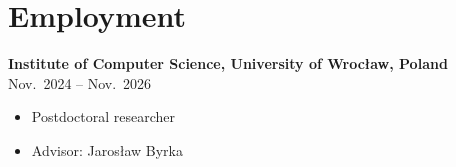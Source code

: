 \documentclass{article}
\newcommand{\killinitspace}{-0.7em}
\begin{document}
\section{Employment}
\textbf{Institute of Computer Science, University of Wrocław, Poland} \hfill Nov.~2024 -- Nov.~2026
\vspace{\killinitspace}
\begin{itemize}
\item Postdoctoral researcher
\item Advisor: Jarosław Byrka
\end{itemize}

\end{document}
